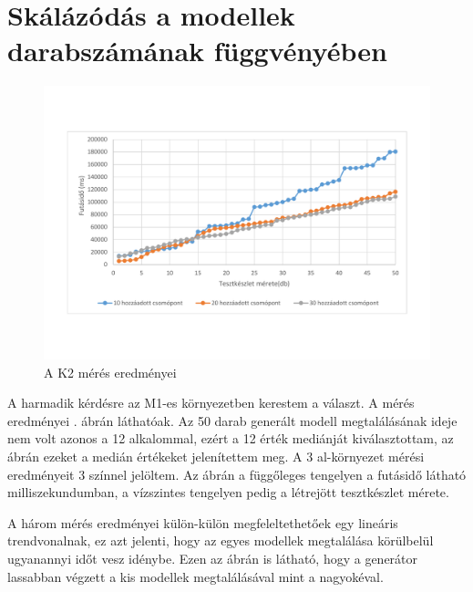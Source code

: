 \section{Skálázódás a modellek darabszámának függvényében}
 
\begin{figure}
	\centering                                                    
	\includegraphics[width=1\textwidth]{figures/statisticsPlottalA}
	\caption{A K2 mérés eredményei}
	\label{fig:AmeresEredmeny}
\end{figure}
                                                                                                                                                                                                                                                                                           
A harmadik kérdésre az M1-es környezetben kerestem a választ. A mérés eredményei . ábrán láthatóak. Az 50 darab generált modell megtalálásának ideje nem volt azonos a 12 alkalommal, ezért a 12 érték mediánját kiválasztottam, az ábrán ezeket a medián értékeket jelenítettem meg. A 3 al-környezet mérési eredményeit 3 színnel jelöltem. Az ábrán a függőleges tengelyen a futásidő látható milliszekundumban,  a vízszintes tengelyen pedig a létrejött tesztkészlet mérete.  

A három mérés eredményei külön-külön megfeleltethetőek egy lineáris trendvonalnak, ez azt jelenti, hogy az egyes modellek megtalálása körülbelül ugyanannyi időt vesz idénybe. Ezen az ábrán is látható, hogy a generátor lassabban végzett a kis modellek megtalálásával  mint a nagyokéval. 
                                                                                                               
